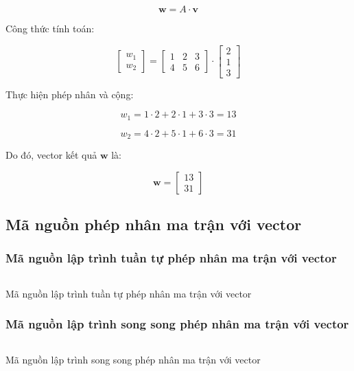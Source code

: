 \[ \mathbf{w} = A \cdot \mathbf{v} \]

Công thức tính toán:

\[ \begin{bmatrix} w_1 \\ w_2 \end{bmatrix} = \begin{bmatrix} 1 & 2 & 3 \\ 4 & 5 & 6 \end{bmatrix} \cdot \begin{bmatrix} 2 \\ 1 \\ 3 \end{bmatrix} \]

Thực hiện phép nhân và cộng:

\[ w_1 = 1 \cdot 2 + 2 \cdot 1 + 3 \cdot 3 = 13 \]

\[ w_2 = 4 \cdot 2 + 5 \cdot 1 + 6 \cdot 3 = 31 \]

Do đó, vector kết quả \( \mathbf{w} \) là:

\[ \mathbf{w} = \begin{bmatrix} 13 \\ 31 \end{bmatrix} \]




\subsection{Mã nguồn phép nhân ma trận với vector}

\subsubsection{Mã nguồn lập trình tuần tự phép nhân ma trận với vector}
\begin{listing}[H]
 \centering
 \inputminted{cpp}{sources/MaNguon1TT.cpp}
 \caption{Mã nguồn lập trình tuần tự phép nhân ma trận với vector}
 \label{code:MaNguon1TT}
\end{listing}

\subsubsection{Mã nguồn lập trình song song phép nhân ma trận với vector}
\begin{listing}[H]
 \centering
 \inputminted{cpp}{sources/MaNguon1SS.cpp}
 \caption{Mã nguồn lập trình song song phép nhân ma trận với vector}
 \label{code:MaNguon1SS}
\end{listing}














